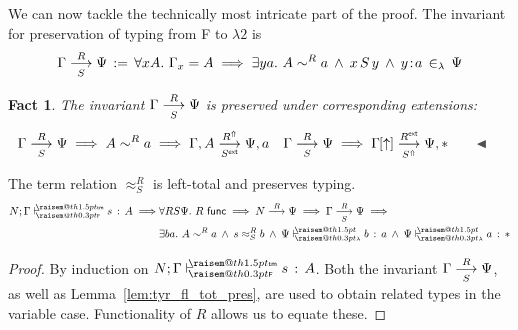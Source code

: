 \documentclass[a4paper,UKenglish]{lipics-v2016}
\makeatletter
\newcommand{\ms}{\,}
\newcommand{\mrel}[1]{\mathrel{\ms #1 \ms}}
\newcommand{\OF}{\mrel{:}}
\newcommand{\mAnd}{\mrel{\wedge}}
\newcommand{\mAll}[1]{\ensuremath{\forall} #1.\ms\ms}
\newcommand{\mEx}[1]{\ensuremath{\exists} #1.\ms\ms}
\newcommand{\eqdef}{\mrel{:=}}
\newcommand{\SysL}{$\lambda2$\xspace}
\newcommand{\tm}{\mathsf{tm}}
\newcommand{\of}{\ensuremath{\!:\!}}
\newcommand{\cc}[2]{#1;#2} %
\newcommand{\raisemath}[1]{\mathpalette{\raisem@th{#1}}}
\newcommand{\raisem@th}[3]{\raisebox{#1}{\ensuremath{#2#3}}}
\newcommand{\tsAnnot}[2]{\vdash\hspace{-.7em}^{\raisemath{1.5pt}{\scriptscriptstyle{#2}}}_{\raisemath{0.3pt}{\scriptscriptstyle{#1}}}} %
\newcommand{\tyF}{\tsAnnot{\mathsf{F}}{\tm}}  %
\newcommand{\typingF}[3]{\ensuremath{{#1} \mathrel{\tyF} #2 \OF #3}}
\newcommand{\tyL}{\tsAnnot{\lambda}{}} %
\newcommand{\typingL}[3]{\ensuremath{{#1} \mathrel{\tyL} #2 \OF #3}}
\newcommand{\inL}{\mrel{\in_{\lambda}}}
\newcommand{\tyr}{\mathrel{\sim}}
\newcommand{\tmr}{\mathrel{\approx}}
\newcommand{\Rext}[1]{\ensuremath{#1^{\mathsf{ext}}}}
\newcommand{\Rshift}[1]{\ensuremath{#1^{\Uparrow}}}
\newcommand{\tyctxrelFL}[3]{\ensuremath{#1\mathrel{\mathop{\longrightarrow}^{#2}\limits}#3}}
\newcommand{\tmctxrelFL}[4]{\ensuremath{#1\mathrel{\mathop{\longrightarrow}^{#2}_{#3}\limits}#4}}
\newcommand{\Prp}{\ensuremath{\textrm{\textasteriskcentered}}}
\newcommand{\subst}[1]{\hphantom{|}\!\![{#1}]}
\newcommand{\shift}{\ensuremath{\uparrow}}
\theoremstyle{plain}
\newtheorem{fact}[theorem]{Fact}
\makeatother
\begin{document}
We can now tackle the technically most intricate part of the proof.
The invariant for preservation of typing from F to \SysL is
\begin{align*}
  \tmctxrelFL{\Gamma}{R}{S}{\Psi} \eqdef \mAll {x A} \Gamma_x = A \implies \mEx{y a} A \tyr^R a \mAnd x\,S\,y \mAnd y \of a \inL \Psi
\end{align*}
\begin{fact}
  \label{fac:inv-tmfl-ext}
  The invariant $\tmctxrelFL{\Gamma}{R}{S}{\Psi}$ is preserved under corresponding extensions:
  \begin{align*}
  &\tmctxrelFL{\Gamma}{R}{S}{\Psi} \implies A \tyr^R a \implies \tmctxrelFL{\Gamma,A}{\Rshift{R}}{\Rext{S}}{\Psi,a} & &\tmctxrelFL{\Gamma}{R}{S}{\Psi} \implies \tmctxrelFL{\Gamma\subst{\shift}}{\Rext{R}}{\Rshift{S}}{\Psi,\Prp}\tag*{\qedsymbol}
  \end{align*}
\end{fact}
\begin{lemma}
  The term relation $\tmr^R_S$ is left-total and preserves typing.
  \begin{align*}
    \typingF{\cc{N}{\Gamma}}{s}{A} \implies &\mAll{R S \Psi} R\ms\ms\mathsf{func} \implies \tyctxrelFL{N}{R}{\Psi} \implies \tmctxrelFL{\Gamma}{R}{S}{\Psi} \implies \\
                                            &\mEx{b a} A \tyr^R a \mAnd s \tmr^R_S b \mAnd \typingL{\Psi}{b}{a} \mAnd \typingL{\Psi}{a}{\Prp}
  \end{align*}
\end{lemma}
\begin{proof}
  By induction on $\typingF{\cc{N}{\Gamma}}{s}{A}$.
  Both the invariant $\tmctxrelFL{\Gamma}{R}{S}{\Psi}$, as well as Lemma~\ref{lem:tyr_fl_tot_pres}, are used to obtain related types in the variable case.
  Functionality of $R$ allows us to equate these.
\end{proof}
\end{document}
